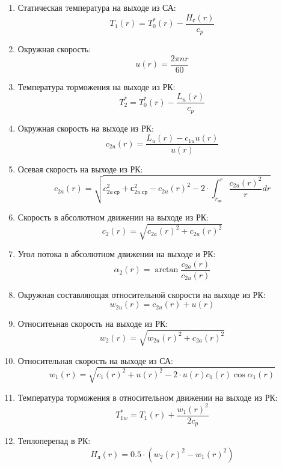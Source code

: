 \documentclass[a4paper,10pt]{article}
\begin{document}
\begin{enumerate}
        \item Статическая температура на выходе из СА:
        \[
            T_1 (r) = T_0^*(r) - \frac{H_с (r)}{c_p}
        \]

        \item Окружная скорость:
        \[
            u(r) = \frac{2 \pi n r}{60}
        \]

        \item Температура торможения на выходе из РК:
        \[
            T_2^* = T_0^*(r) - \frac{L_u (r)}{c_p}
        \]

        \item Окружная скорость на выходе из РК:
        \[
            c_{2u}(r) = \frac{L_u(r) - c_{1u} u(r)}{u(r)}
        \]

        \item Осевая скорость на выходе из РК:
        \[
            c_{2a}(r) = \sqrt{
                    c_{2a\ ср}^2 + с_{2u\ ср}^2 - c_{2u}(r)^2 -
                    2 \cdot \int_{r_{ср}}^{r} \frac{c_{2u}(r)^2}{r} dr
            }
        \]

        \item Скорость в абсолютном движении на выходе из РК:
        \[
            c_2(r) = \sqrt{c_{2a}(r)^2 + c_{2u}(r)^2}
        \]

        \item Угол потока в абсолютном движении на выходе и РК:
        \[
            \alpha_2 (r) = \arctan{\frac{c_{2a}(r)}{c_{2u}(r)}}
        \]

        \item Окружная составляющая относительной скорости на выходе из РК:
        \[
            w_{2u}(r) = c_{2u}(r) + u(r)
        \]

        \item Относитеьная скорость на выходе из РК:
        \[
            w_2 (r) = \sqrt{w_{2u}(r)^2 + c_{2a}(r)^2}
        \]

        \item Относительная скорость на выходе из СА:
        \[
            w_1 (r) = \sqrt{c_1(r)^2 + u(r)^2 - 2 \cdot u(r) c_1(r) \cos{\alpha_1(r)}}
        \]

        \item Температура торможения в относительном движении на выходе из РК:
        \[
            T_{1w}^* = T_1(r) + \frac{w_1(r) ^ 2}{2 c_p}
        \]

        \item Теплоперепад в РК:
        \[
            H_л (r) = 0.5 \cdot (w_2(r)^2 - w_1(r)^2)
        \]


\end{enumerate}
\end{document}
